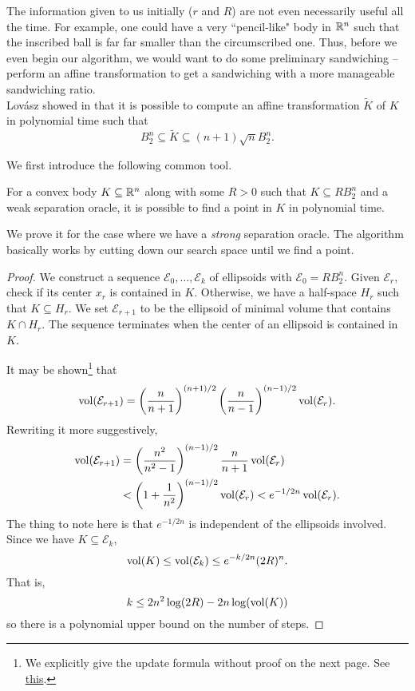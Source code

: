 The information given to us initially ($r$ and $R$) are not even necessarily useful all the time. For example, one could have a very ``pencil-like" body in $\mathbb{R}^n$ such that the inscribed ball is far far smaller than the circumscribed one. Thus, before we even begin our algorithm, we would want to do some preliminary sandwiching -- perform an affine transformation to get a sandwiching with a more manageable sandwiching ratio.\\

Lov\'asz showed in \cite{Lovsz1986AlgorithmicTO} that it is possible to compute an affine transformation $\tilde{K}$ of $K$ in polynomial time such that
\begin{equation}
\label{eqn weak lowner john ellipsoid}
    B_2^n\subseteq \tilde{K} \subseteq (n+1)\sqrt{n} B_2^n.
\end{equation}

We first introduce the following common tool.

\begin{lemma}
For a convex body $K\subseteq\mathbb{R}^n$ along with some $R>0$ such that $K\subseteq RB_2^n$ and a weak separation oracle, it is possible to find a point in $K$ in polynomial time.
\end{lemma}
We prove it for the case where we have a \textit{strong} separation oracle. The algorithm basically works by cutting down our search space until we find a point.
\begin{proof}
We construct a sequence $\mathcal{E}_0,\ldots,\mathcal{E}_k$ of ellipsoids with $\mathcal{E}_0 = R B_2^n$. Given $\mathcal{E}_r$, check if its center $x_r$ is contained in $K$. Otherwise, we have a half-space $H_r$ such that $K\subseteq H_r$. We set $\mathcal{E}_{r+1}$ to be the ellipsoid of minimal volume that contains $K\cap H_r$. The sequence terminates when the center of an ellipsoid is contained in $K$.

It may be shown\footnote{We explicitly give the update formula without proof on the next page. See \href{https://web.stanford.edu/class/ee364b/lectures/ellipsoid_method_notes.pdf}{this}.} that
\[ \operatorname{vol}(\mathcal{E}_{r+1}) = \left(\frac{n}{n+1}\right)^{(n+1)/2}\left(\frac{n}{n-1}\right)^{(n-1)/2} \operatorname{vol}(\mathcal{E}_{r}). \]
Rewriting it more suggestively,
\begin{align*}
    \operatorname{vol}(\mathcal{E}_{r+1}) &= \left(\frac{n^2}{n^2-1}\right)^{(n-1)/2} \frac{n}{n+1} \operatorname{vol}(\mathcal{E}_{r}) \\
    &< \left(1+\frac{1}{n^2}\right)^{(n-1)/2} \operatorname{vol}(\mathcal{E}_r) < e^{-1/2n} \operatorname{vol}(\mathcal{E}_r).
\end{align*}
The thing to note here is that $e^{-1/2n}$ is independent of the ellipsoids involved. Since we have $K\subseteq \mathcal{E}_k$,
\[ \operatorname{vol} (K)\leq \operatorname{vol}(\mathcal{E}_k) \leq e^{-k/2n}(2R)^n.  \]
That is,
\[ k \leq 2n^2 \log(2R) - 2n \log(\operatorname{vol} (K)) \]
so there is a polynomial upper bound on the number of steps.
\end{proof}

